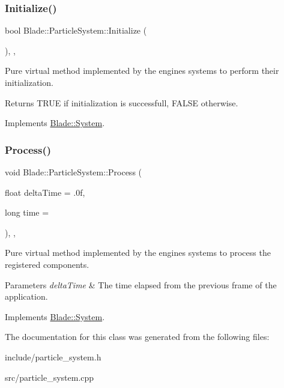 \subsubsection{\texorpdfstring{Initialize()}{Initialize()}}
{\footnotesize\ttfamily bool Blade\+::\+Particle\+System\+::\+Initialize (\begin{DoxyParamCaption}{ }\end{DoxyParamCaption})\hspace{0.3cm}{\ttfamily [override]}, {\ttfamily [virtual]}, {\ttfamily [noexcept]}}



Pure virtual method implemented by the engine\textquotesingle{}s systems to perform their initialization. 

\begin{DoxyReturn}{Returns}
T\+R\+UE if initialization is successfull, F\+A\+L\+SE otherwise. 
\end{DoxyReturn}


Implements \hyperlink{class_blade_1_1_system_a63fa00af40dc54d093300eff4785f26f}{Blade\+::\+System}.

\mbox{\label{class_blade_1_1_particle_system_a01e4983673061d797da072324a98d8d4}} 
\subsubsection{\texorpdfstring{Process()}{Process()}}
{\footnotesize\ttfamily void Blade\+::\+Particle\+System\+::\+Process (\begin{DoxyParamCaption}\item[{float}]{delta\+Time = {\ttfamily .0f},  }\item[{long}]{time = {} }\end{DoxyParamCaption})\hspace{0.3cm}{\ttfamily [override]}, {\ttfamily [virtual]}, {\ttfamily [noexcept]}}



Pure virtual method implemented by the engine\textquotesingle{}s systems to process the registered components. 


\begin{DoxyParams}{Parameters}
{\em delta\+Time} & The time elapsed from the previous frame of the application. \\
\hline
\end{DoxyParams}


Implements \hyperlink{class_blade_1_1_system_a80c186f5f9f8fa4fd317b861853fe6a8}{Blade\+::\+System}.



The documentation for this class was generated from the following files\+:\begin{DoxyCompactItemize}
\item 
include/particle\+\_\+system.\+h\item 
src/particle\+\_\+system.\+cpp\end{DoxyCompactItemize}
